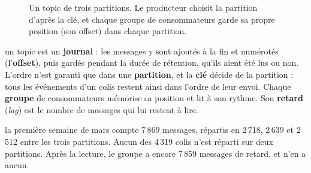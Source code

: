\begin{figure}[H]
\centering
{}
\caption{Un topic de trois partitions. Le producteur choisit la partition d'après la clé, et chaque
groupe de consommateurs garde sa propre position (son offset) dans chaque partition.}
\label{c6:fig:kafka}
\end{figure}

\begin{notion}
un topic est un \textbf{journal} : les messages y sont ajoutés à la
fin et numérotés (l'\textbf{offset}), puis gardés pendant la durée de rétention, qu'ils aient été
lus ou non. L'ordre n'est garanti que dans une \textbf{partition}, et la \textbf{clé} décide de la
partition : tous les événements d'un colis restent ainsi dans l'ordre de leur envoi. Chaque
\textbf{groupe} de consommateurs mémorise sa position et lit à son rythme. Son \textbf{retard}
(\emph{lag}) est le nombre de messages qui lui restent à lire.
\end{notion}

\begin{resultat}
la première semaine de mars compte 7\,869 messages, répartis en 2\,718, 2\,639 et 2\,512 entre les
trois partitions. Aucun des 4\,319 colis n'est réparti sur deux partitions. Après la lecture, le
groupe  a encore 7\,859 messages de retard, et  n'en a
aucun.
\end{resultat}

